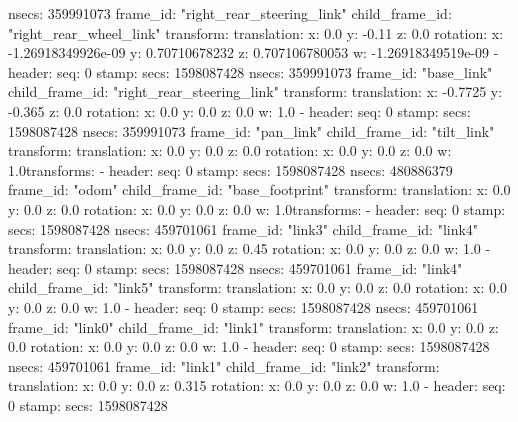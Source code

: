         nsecs: 359991073
      frame_id: "right_rear_steering_link"
    child_frame_id: "right_rear_wheel_link"
    transform: 
      translation: 
        x: 0.0
        y: -0.11
        z: 0.0
      rotation: 
        x: -1.26918349926e-09
        y: 0.70710678232
        z: 0.707106780053
        w: -1.26918349519e-09
  - 
    header: 
      seq: 0
      stamp: 
        secs: 1598087428
        nsecs: 359991073
      frame_id: "base_link"
    child_frame_id: "right_rear_steering_link"
    transform: 
      translation: 
        x: -0.7725
        y: -0.365
        z: 0.0
      rotation: 
        x: 0.0
        y: 0.0
        z: 0.0
        w: 1.0
  - 
    header: 
      seq: 0
      stamp: 
        secs: 1598087428
        nsecs: 359991073
      frame_id: "pan_link"
    child_frame_id: "tilt_link"
    transform: 
      translation: 
        x: 0.0
        y: 0.0
        z: 0.0
      rotation: 
        x: 0.0
        y: 0.0
        z: 0.0
        w: 1.0transforms: 
  - 
    header: 
      seq: 0
      stamp: 
        secs: 1598087428
        nsecs: 480886379
      frame_id: "odom"
    child_frame_id: "base_footprint"
    transform: 
      translation: 
        x: 0.0
        y: 0.0
        z: 0.0
      rotation: 
        x: 0.0
        y: 0.0
        z: 0.0
        w: 1.0transforms: 
  - 
    header: 
      seq: 0
      stamp: 
        secs: 1598087428
        nsecs: 459701061
      frame_id: "link3"
    child_frame_id: "link4"
    transform: 
      translation: 
        x: 0.0
        y: 0.0
        z: 0.45
      rotation: 
        x: 0.0
        y: 0.0
        z: 0.0
        w: 1.0
  - 
    header: 
      seq: 0
      stamp: 
        secs: 1598087428
        nsecs: 459701061
      frame_id: "link4"
    child_frame_id: "link5"
    transform: 
      translation: 
        x: 0.0
        y: 0.0
        z: 0.0
      rotation: 
        x: 0.0
        y: 0.0
        z: 0.0
        w: 1.0
  - 
    header: 
      seq: 0
      stamp: 
        secs: 1598087428
        nsecs: 459701061
      frame_id: "link0"
    child_frame_id: "link1"
    transform: 
      translation: 
        x: 0.0
        y: 0.0
        z: 0.0
      rotation: 
        x: 0.0
        y: 0.0
        z: 0.0
        w: 1.0
  - 
    header: 
      seq: 0
      stamp: 
        secs: 1598087428
        nsecs: 459701061
      frame_id: "link1"
    child_frame_id: "link2"
    transform: 
      translation: 
        x: 0.0
        y: 0.0
        z: 0.315
      rotation: 
        x: 0.0
        y: 0.0
        z: 0.0
        w: 1.0
  - 
    header: 
      seq: 0
      stamp: 
        secs: 1598087428
